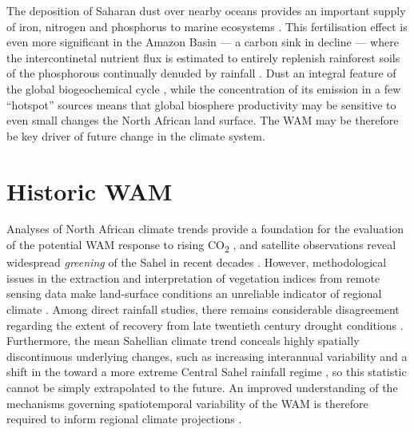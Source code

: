 \documentclass[a4paper]{article}
\begin{document}
The deposition of Saharan dust over nearby oceans provides an important supply of iron, nitrogen and phosphorus to marine ecosystems \parencite{prospero1996saharan, prospero1996atmospheric, guieu2002chemical, mills2004iron, bristow2010fertilizing, okin2011impacts}.
This fertilisation effect is even more significant in the Amazon Basin --- a carbon sink in decline \parencite{brienen2015long} --- where the intercontinetal nutrient flux is estimated to entirely replenish rainforest soils of the phosphorous continually denuded by rainfall \parencite{swap1992saharan, bristow2010fertilizing, yu2015fertilizing}.
Dust an integral feature of the global biogeochemical cycle \parencite{ridgwell2002dust, harrison2001role, jickells2005global, mahowald2005atmospheric}, while the concentration of its emission in a few ``hotspot'' sources \parencite{koren2006bodele, ben2010transport, schepanski2009saharan, knippertz2010central} means that global biosphere productivity may be sensitive to even small changes the North African land surface. 
The WAM may be therefore be key driver of future change in the climate system.

\section{Historic WAM}
Analyses of North African climate trends provide a foundation for the evaluation of the potential WAM response to rising CO\textsubscript{2} \parencite{redelsperger2006african}, and satellite observations reveal widespread \emph{greening} of the Sahel in recent decades \parencite{olsson2005recent, dardel2014re}.
However, methodological issues in the extraction and interpretation of vegetation indices from remote sensing data make land-surface conditions an unreliable indicator of regional climate \parencite{fensholt2013assessing, dardel2014rain}.
Among direct rainfall studies, there remains considerable disagreement regarding the extent of recovery from late twentieth century drought conditions \parencite{nicholson2005question, nicholson2013west}.
Furthermore, the mean Sahellian climate trend conceals highly spatially discontinuous underlying changes, such as increasing interannual variability and a shift in the toward a more extreme Central Sahel rainfall regime \parencite{nicholson2013west, lebel2009recent, panthou2014recent}, so this statistic cannot be simply extrapolated to the future.
An improved understanding of the mechanisms governing spatiotemporal variability of the WAM is therefore required to inform regional climate projections \parencite{redelsperger2006african}.
\end{document}
